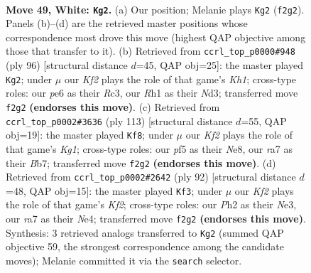 \documentclass[11pt]{article}
\begin{document}
\clearpage

\begin{figure}[p]\centering
\begin{subfigure}{0.46\textwidth}\centering
\resizebox{\linewidth}{!}{%
\newchessgame
\chessboard[
  setfen={1nb2k2/rp2n3/4p3/5p1B/PpN2P2/1P4PN/5K1P/7R w - - 5 49},
  showmover=false,
  pgfstyle=straightmove, color=movearrow, markmove={f2-g2}
]}
\caption{}
\end{subfigure}\hfill
\begin{subfigure}{0.46\textwidth}\centering
\resizebox{\linewidth}{!}{%
\newchessgame
\chessboard[
  setfen={8/1r2npk1/3b1p2/p2p4/B2P2p1/2RN2P1/1P3P1P/7K w - - 1 49},
  showmover=false,
  pgfstyle=straightmove, color=movearrow, markmove={h1-g2}
]}
\caption{}
\end{subfigure}
\\[4pt]
\begin{subfigure}{0.46\textwidth}\centering
\resizebox{\linewidth}{!}{%
\newchessgame
\chessboard[
  setfen={4n1k1/1bn3p1/1N3p1p/4p3/2N1P3/5PPP/6B1/6K1 b - - 0 57},
  showmover=false,
  pgfstyle=straightmove, color=movearrow, markmove={g8-f8}
]}
\caption{}
\end{subfigure}\hfill
\begin{subfigure}{0.46\textwidth}\centering
\resizebox{\linewidth}{!}{%
\newchessgame
\chessboard[
  setfen={2r2b2/3R1Ppk/p6p/Pn5P/4NP2/2p1N1P1/5K2/8 w - - 3 47},
  showmover=false,
  pgfstyle=straightmove, color=movearrow, markmove={f2-f3}
]}
\caption{}
\end{subfigure}
\caption{\textbf{Move 49, White: \texttt{Kg2}.} (a) Our position; Melanie plays \texttt{Kg2} (\texttt{f2g2}). Panels (b)--(d) are the retrieved master positions whose correspondence most drove this move (highest QAP objective among those that transfer to it). (b) Retrieved from \texttt{ccrl\_top\_p0000\#948} (ply 96) [structural distance $d$=45, QAP obj=25]: the master played \texttt{Kg2}; under $\mu$ our \emph{Kf2} plays the role of that game's \emph{Kh1}; cross-type roles: our \emph{p}e6 as their \emph{R}c3, our \emph{R}h1 as their \emph{N}d3; transferred move \texttt{f2g2} \textbf{(endorses this move)}. (c) Retrieved from \texttt{ccrl\_top\_p0002\#3636} (ply 113) [structural distance $d$=55, QAP obj=19]: the master played \texttt{Kf8}; under $\mu$ our \emph{Kf2} plays the role of that game's \emph{Kg1}; cross-type roles: our \emph{p}f5 as their \emph{N}e8, our \emph{r}a7 as their \emph{B}b7; transferred move \texttt{f2g2} \textbf{(endorses this move)}. (d) Retrieved from \texttt{ccrl\_top\_p0002\#2642} (ply 92) [structural distance $d$=48, QAP obj=15]: the master played \texttt{Kf3}; under $\mu$ our \emph{Kf2} plays the role of that game's \emph{Kf2}; cross-type roles: our \emph{P}h2 as their \emph{N}e3, our \emph{r}a7 as their \emph{N}e4; transferred move \texttt{f2g2} \textbf{(endorses this move)}. Synthesis: 3 retrieved analogs transferred to \texttt{Kg2} (summed QAP objective 59, the strongest correspondence among the candidate moves); Melanie committed it via the \texttt{search} selector.}
\label{fig:thought-m96}
\end{figure}
\end{document}
